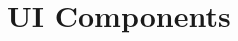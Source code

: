 \documentclass{book}
\begin{document}

\tableofcontents

\chapter{UI Components}


% 

% 

% 

% 



\end{document}
